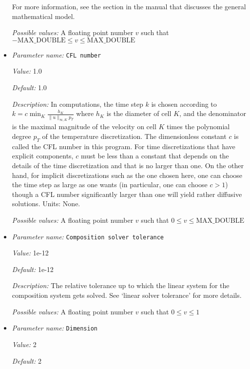 \begin{itemize}
For more information, see the section in the manual that discusses the general mathematical model.


{\it Possible values:} A floating point number $v$ such that $-\text{MAX\_DOUBLE} \leq v \leq \text{MAX\_DOUBLE}$
\item {\it Parameter name:} {\tt CFL number}
\label{parameters:CFL number}


{\it Value:} 1.0


{\it Default:} 1.0


{\it Description:} In computations, the time step $k$ is chosen according to $k = c \min_K \frac {h_K} {\|u\|_{\infty,K} p_T}$ where $h_K$ is the diameter of cell $K$, and the denominator is the maximal magnitude of the velocity on cell $K$ times the polynomial degree $p_T$ of the temperature discretization. The dimensionless constant $c$ is called the CFL number in this program. For time discretizations that have explicit components, $c$ must be less than a constant that depends on the details of the time discretization and that is no larger than one. On the other hand, for implicit discretizations such as the one chosen here, one can choose the time step as large as one wants (in particular, one can choose $c>1$) though a CFL number significantly larger than one will yield rather diffusive solutions. Units: None.


{\it Possible values:} A floating point number $v$ such that $0 \leq v \leq \text{MAX\_DOUBLE}$
\item {\it Parameter name:} {\tt Composition solver tolerance}
\label{parameters:Composition solver tolerance}


{\it Value:} 1e-12


{\it Default:} 1e-12


{\it Description:} The relative tolerance up to which the linear system for the composition system gets solved. See `linear solver tolerance' for more details.


{\it Possible values:} A floating point number $v$ such that $0 \leq v \leq 1$
\item {\it Parameter name:} {\tt Dimension}
\label{parameters:Dimension}


{\it Value:} 2


{\it Default:} 2



\end{itemize}
